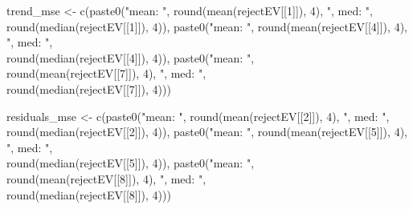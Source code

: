 \documentclass[specialist,
               substylefile = spbu_report.rtx,
               subf,href,colorlinks=true, 12pt]{disser}
\theoremstyle{definition}
\newenvironment{Shaded}{\begin{snugshade}}{\end{snugshade}}
\newcommand{\DecValTok}[1]{\textcolor[rgb]{0.00,0.00,0.81}{#1}}
\newcommand{\FunctionTok}[1]{\textcolor[rgb]{0.00,0.00,0.00}{#1}}
\newcommand{\NormalTok}[1]{#1}
\newcommand{\OtherTok}[1]{\textcolor[rgb]{0.56,0.35,0.01}{#1}}
\newcommand{\StringTok}[1]{\textcolor[rgb]{0.31,0.60,0.02}{#1}}
\begin{document}
\begin{Shaded}
\begin{Highlighting}[]
\NormalTok{  trend\_mse }\OtherTok{\textless{}{-}} \FunctionTok{c}\NormalTok{(}\FunctionTok{paste0}\NormalTok{(}\StringTok{"mean: "}\NormalTok{, }\FunctionTok{round}\NormalTok{(}\FunctionTok{mean}\NormalTok{(rejectEV[[}\DecValTok{1}\NormalTok{]]), }\DecValTok{4}\NormalTok{), }\StringTok{", med: "}\NormalTok{, }
\\ \FunctionTok{round}\NormalTok{(}\FunctionTok{median}\NormalTok{(rejectEV[[}\DecValTok{1}\NormalTok{]]), }\DecValTok{4}\NormalTok{)),}
                 \FunctionTok{paste0}\NormalTok{(}\StringTok{"mean: "}\NormalTok{, }\FunctionTok{round}\NormalTok{(}\FunctionTok{mean}\NormalTok{(rejectEV[[}\DecValTok{4}\NormalTok{]]), }\DecValTok{4}\NormalTok{), }\StringTok{", med: "}\NormalTok{, }
                 \\ \FunctionTok{round}\NormalTok{(}\FunctionTok{median}\NormalTok{(rejectEV[[}\DecValTok{4}\NormalTok{]]), }\DecValTok{4}\NormalTok{)),}
                 \FunctionTok{paste0}\NormalTok{(}\StringTok{"mean: "}\NormalTok{, }
                 \\ \FunctionTok{round}\NormalTok{(}\FunctionTok{mean}\NormalTok{(rejectEV[[}\DecValTok{7}\NormalTok{]]), }\DecValTok{4}\NormalTok{), }\StringTok{", med: "}\NormalTok{, }
                 \\ \FunctionTok{round}\NormalTok{(}\FunctionTok{median}\NormalTok{(rejectEV[[}\DecValTok{7}\NormalTok{]]), }\DecValTok{4}\NormalTok{)))}
  
\NormalTok{  residuals\_mse }\OtherTok{\textless{}{-}} \FunctionTok{c}\NormalTok{(}\FunctionTok{paste0}\NormalTok{(}\StringTok{"mean: "}\NormalTok{, }\FunctionTok{round}\NormalTok{(}\FunctionTok{mean}\NormalTok{(rejectEV[[}\DecValTok{2}\NormalTok{]]), }\DecValTok{4}\NormalTok{), }\StringTok{", med: "}\NormalTok{, }
\\ \FunctionTok{round}\NormalTok{(}\FunctionTok{median}\NormalTok{(rejectEV[[}\DecValTok{2}\NormalTok{]]), }\DecValTok{4}\NormalTok{)),}
                     \FunctionTok{paste0}\NormalTok{(}\StringTok{"mean: "}\NormalTok{, }\FunctionTok{round}\NormalTok{(}\FunctionTok{mean}\NormalTok{(rejectEV[[}\DecValTok{5}\NormalTok{]]), }\DecValTok{4}\NormalTok{), }\StringTok{", med: "}\NormalTok{, }
                     \\ \FunctionTok{round}\NormalTok{(}\FunctionTok{median}\NormalTok{(rejectEV[[}\DecValTok{5}\NormalTok{]]), }\DecValTok{4}\NormalTok{)),}
                     \FunctionTok{paste0}\NormalTok{(}\StringTok{"mean: "}\NormalTok{, }
                     \\ \FunctionTok{round}\NormalTok{(}\FunctionTok{mean}\NormalTok{(rejectEV[[}\DecValTok{8}\NormalTok{]]), }\DecValTok{4}\NormalTok{), }\StringTok{", med: "}\NormalTok{, }
                     \\ \FunctionTok{round}\NormalTok{(}\FunctionTok{median}\NormalTok{(rejectEV[[}\DecValTok{8}\NormalTok{]]), }\DecValTok{4}\NormalTok{)))}
  

\end{Highlighting}
\end{Shaded}
\end{document}

